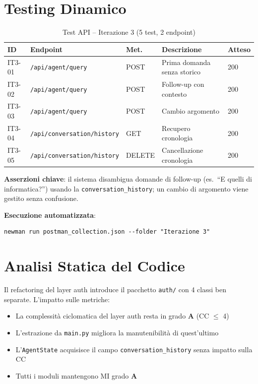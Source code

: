 \documentclass[a4paper,12pt]{report}
\begin{document}
\section{Testing Dinamico}

\begin{table}[H]
\centering
\small
\begin{tabularx}{\textwidth}{l l l X l}
\toprule
\textbf{ID} & \textbf{Endpoint} & \textbf{Met.} & \textbf{Descrizione} & \textbf{Atteso} \\
\midrule
IT3-01 & \texttt{/api/agent/query} & POST & Prima domanda senza storico & 200 \\
IT3-02 & \texttt{/api/agent/query} & POST & Follow-up con contesto & 200 \\
IT3-03 & \texttt{/api/agent/query} & POST & Cambio argomento & 200 \\
IT3-04 & \texttt{/api/conversation/history} & GET & Recupero cronologia & 200 \\
IT3-05 & \texttt{/api/conversation/history} & DELETE & Cancellazione cronologia & 200 \\
\bottomrule
\end{tabularx}
\caption{Test API -- Iterazione 3 (5 test, 2 endpoint)}
\end{table}

\textbf{Asserzioni chiave}: il sistema disambigua domande di follow-up (es.\ ``E quelli di informatica?'') usando la \texttt{conversation\_history}; un cambio di argomento viene gestito senza confusione.

\textbf{Esecuzione automatizzata}:
\begin{verbatim}
newman run postman_collection.json --folder "Iterazione 3"
\end{verbatim}

\section{Analisi Statica del Codice}

Il refactoring del layer auth introduce il pacchetto \texttt{auth/} con 4 classi ben separate. L'impatto sulle metriche:

\begin{itemize}
    \item La complessità ciclomatica del layer auth resta in grado \textbf{A} (CC $\leq$ 4)
    \item L'estrazione da \texttt{main.py} migliora la manutenibilità di quest'ultimo
    \item L'\texttt{AgentState} acquisisce il campo \texttt{conversation\_history} senza impatto sulla CC
    \item Tutti i moduli mantengono MI grado \textbf{A}
\end{itemize}
\end{document}
